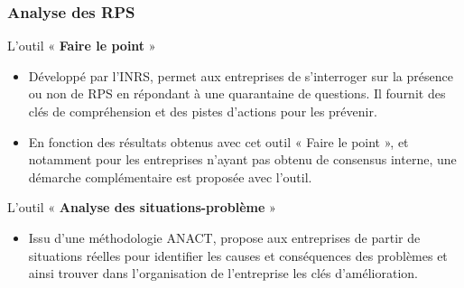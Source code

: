 \documentclass{beamer}
\begin{document}
\begin{frame}
\frametitle{Analyse des RPS}

L’outil « \textbf{Faire le point} »
\begin{itemize}
\item Développé par l’INRS, permet aux entreprises de s’interroger sur la présence ou non de RPS en répondant à une quarantaine de questions. Il fournit des clés de compréhension et des pistes d’actions pour les prévenir.
\item En fonction des résultats obtenus avec cet outil « Faire le point », et notamment pour les entreprises n’ayant pas obtenu de consensus interne, une démarche complémentaire est proposée avec l’outil.
\end{itemize}

L’outil « \textbf{Analyse des situations-problème} »
\begin{itemize}
\item Issu d’une méthodologie ANACT, propose aux entreprises de partir de situations réelles pour identifier les causes et conséquences des problèmes et ainsi trouver dans l’organisation de l’entreprise les clés d’amélioration.
\end{itemize}
\end{frame}
\end{document}
